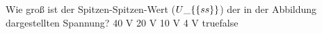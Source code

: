     {Wie groß ist der Spitzen-Spitzen-Wert ($U\_\{\textrm\{ss\}\}$) der in der Abbildung dargestellten Spannung?}
    {40 V}
    {20 V}
    {10 V}
    {4 V}
    {true}{false}